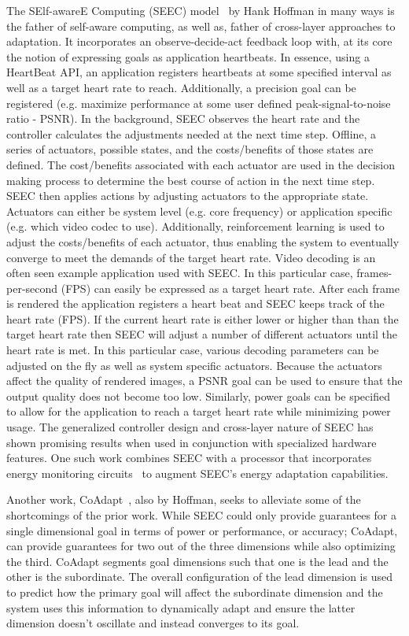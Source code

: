    The SElf-awareE Computing (SEEC) model~\cite{Hoffmann2010,Hoffmann2012,Hoffman2013} by Hank Hoffman in many ways is the father of self-aware computing, as well as, father of cross-layer approaches to adaptation. It incorporates an observe-decide-act feedback loop with, at its core the notion of expressing goals as application heartbeats. In essence, using a HeartBeat API, an application registers heartbeats at some specified interval as well as a target heart rate to reach. Additionally, a precision goal can be registered (e.g. maximize performance at some user defined peak-signal-to-noise ratio - PSNR). In the background, SEEC observes the heart rate and the controller calculates the adjustments needed at the next time step. Offline, a series of actuators, possible states, and the costs/benefits of those states are defined. The cost/benefits associated with each actuator are used in the decision making process to determine the best course of action in the next time step. SEEC then applies actions by adjusting actuators to the appropriate state. Actuators can either be system level (e.g. core frequency) or application specific (e.g. which video codec to use). Additionally, reinforcement learning is used to adjust the costs/benefits of each actuator, thus enabling the system to eventually converge to meet the demands of the target heart rate. Video decoding is an often seen example application used with SEEC. In this particular case, frames-per-second (FPS) can easily be expressed as a target heart rate. After each frame is rendered the application registers a heart beat and SEEC keeps track of the heart rate (FPS). If the current heart rate is either lower or higher than than the target heart rate then SEEC will adjust a number of different actuators until the heart rate is met. In this particular case, various decoding parameters can be adjusted on the fly as well as system specific actuators. Because the actuators affect the quality of rendered images, a PSNR goal can be used to ensure that the output quality does not become too low. Similarly, power goals can be specified to allow for the application to reach a target heart rate while minimizing power usage. The generalized controller design and cross-layer nature of SEEC has shown promising results when used in conjunction with specialized hardware features. One such work combines SEEC with a processor that incorporates energy monitoring circuits~\cite{SinangilEtAl2014} to augment SEEC's energy adaptation capabilities.
    
    Another work, CoAdapt~\cite{Hoffmann2014}, also by Hoffman, seeks to alleviate some of the shortcomings of the prior work. While SEEC could only provide guarantees for a single dimensional goal in terms of power or performance, or accuracy; CoAdapt, can provide guarantees for two out of the three dimensions while also optimizing the third. CoAdapt segments goal dimensions such that one is the lead and the other is the subordinate. The overall configuration of the lead dimension is used to predict how the primary goal will affect the subordinate dimension and the system uses this information to dynamically adapt and ensure the latter dimension doesn't oscillate and instead converges to its goal.
    
